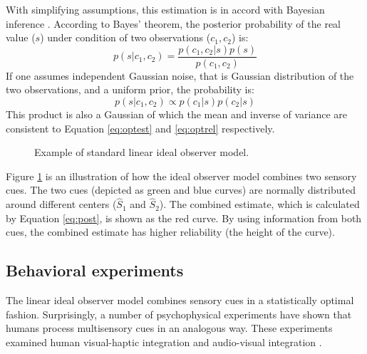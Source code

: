 \documentclass{article}[11pt]
\newcommand{\inputTikZ}[1]{%
}
\begin{document}
With simplifying assumptions, this estimation is in accord with Bayesian inference \cite{knill_bayesian_2004}. According to Bayes' theorem, the posterior probability of the real value ($s$) under condition of two observations ($c_1, c_2$) is:
\begin{equation}
  p(s|c_1,c_2) = \frac{p(c_1,c_2|s)p(s)}{p(c_1,c_2)}
\end{equation}
If one assumes independent Gaussian noise, that is Gaussian distribution of the two observations, and a uniform prior, the probability is:
\begin{equation} \label{eq:post}
  p(s|c_1,c_2) \propto p(c_1|s)p(c_2|s)
\end{equation}
This product is also a Gaussian of which the mean and inverse of variance are consistent to Equation \ref{eq:optest} and \ref{eq:optrel} respectively.

\begin{figure}[tpbh]
  \centering \inputTikZ{bayes}
  \caption{Example of standard linear ideal observer model.}
  \label{fig:bayes}
\end{figure}

Figure \ref{fig:bayes} is an illustration of how the ideal observer model combines two sensory cues. The two cues (depicted as green and blue curves) are normally distributed around different centers ($\hat{S}_1$ and $\hat{S}_2$). The combined estimate, which is calculated by Equation \ref{eq:post}, is shown as the red curve. By using information from both cues, the combined estimate has higher reliability (the height of the curve).

\subsection{Behavioral experiments}
The linear ideal observer model combines sensory cues in a statistically optimal fashion. Surprisingly, a number of psychophysical experiments have shown that humans process multisensory cues in an analogous way. These experiments examined human visual-haptic integration \cite{ernst_humans_2002} and audio-visual integration \cite{alais_ventriloquist_2004}.
\end{document}
